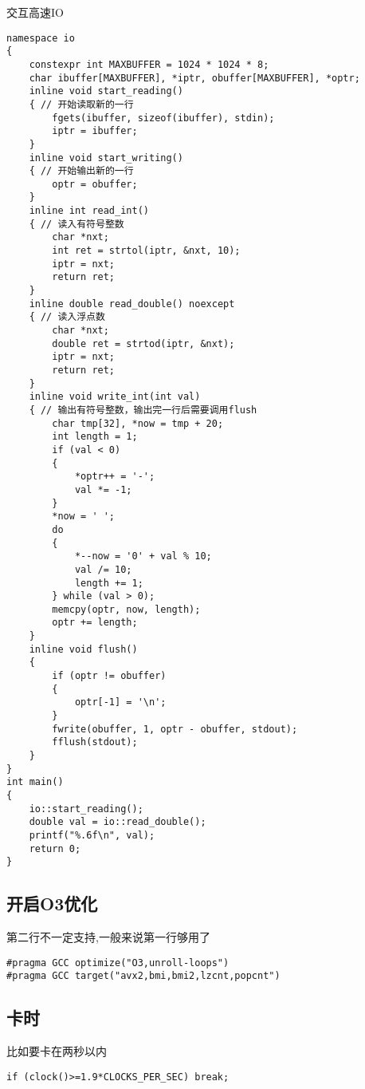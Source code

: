 \documentclass[a4paper]{ctexart}
\begin{document}
交互高速IO

\begin{lstlisting}
namespace io
{
    constexpr int MAXBUFFER = 1024 * 1024 * 8;
    char ibuffer[MAXBUFFER], *iptr, obuffer[MAXBUFFER], *optr;
    inline void start_reading()
    { // 开始读取新的一行
        fgets(ibuffer, sizeof(ibuffer), stdin);
        iptr = ibuffer;
    }
    inline void start_writing()
    { // 开始输出新的一行
        optr = obuffer;
    }
    inline int read_int()
    { // 读入有符号整数
        char *nxt;
        int ret = strtol(iptr, &nxt, 10);
        iptr = nxt;
        return ret;
    }
    inline double read_double() noexcept
    { // 读入浮点数
        char *nxt;
        double ret = strtod(iptr, &nxt);
        iptr = nxt;
        return ret;
    }
    inline void write_int(int val)
    { // 输出有符号整数，输出完一行后需要调用flush
        char tmp[32], *now = tmp + 20;
        int length = 1;
        if (val < 0)
        {
            *optr++ = '-';
            val *= -1;
        }
        *now = ' ';
        do
        {
            *--now = '0' + val % 10;
            val /= 10;
            length += 1;
        } while (val > 0);
        memcpy(optr, now, length);
        optr += length;
    }
    inline void flush()
    {
        if (optr != obuffer)
        {
            optr[-1] = '\n';
        }
        fwrite(obuffer, 1, optr - obuffer, stdout);
        fflush(stdout);
    }
}
int main()
{
    io::start_reading();
    double val = io::read_double();
    printf("%.6f\n", val);
    return 0;
}
\end{lstlisting}

\subsection{开启O3优化}
第二行不一定支持,一般来说第一行够用了
\begin{lstlisting}
#pragma GCC optimize("O3,unroll-loops")
#pragma GCC target("avx2,bmi,bmi2,lzcnt,popcnt")
\end{lstlisting}

\subsection{卡时}
比如要卡在两秒以内

\begin{lstlisting}
if (clock()>=1.9*CLOCKS_PER_SEC) break;
\end{lstlisting}
\end{document}
